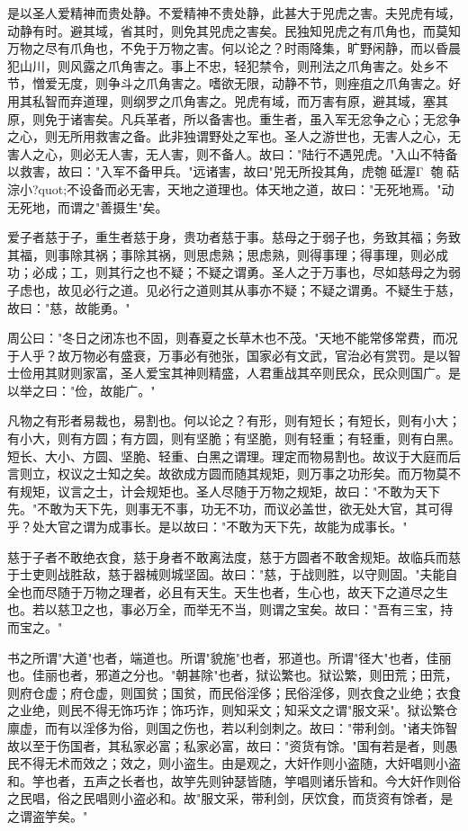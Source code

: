 \documentclass[]{article}
\begin{document}
是以圣人爱精神而贵处静。不爱精神不贵处静，此甚大于兕虎之害。夫兕虎有域，动静有时。避其域，省其时，则免其兕虎之害矣。民独知兕虎之有爪角也，而莫知万物之尽有爪角也，不免于万物之害。何以论之？时雨降集，旷野闲静，而以昏晨犯山川，则风露之爪角害之。事上不忠，轻犯禁令，则刑法之爪角害之。处乡不节，憎爱无度，则争斗之爪角害之。嗜欲无限，动静不节，则痤疽之爪角害之。好用其私智而弃道理，则纲罗之爪角害之。兕虎有域，而万害有原，避其域，塞其原，则免于诸害矣。凡兵革者，所以备害也。重生者，虽入军无忿争之心；无忿争之心，则无所用救害之备。此非独谓野处之军也。圣人之游世也，无害人之心，无害人之心，则必无人害，无人害，则不备人。故曰："陆行不遇兕虎。"入山不特备以救害，故曰："入军不备甲兵。"远诸害，故曰"兕无所投其角，虎匏砥渥Γ匏萜淙小?quot;不设备而必无害，天地之道理也。体天地之道，故曰："无死地焉。"动无死地，而谓之"善摄生"矣。

爱子者慈于子，重生者慈于身，贵功者慈于事。慈母之于弱子也，务致其福；务致其福，则事除其祸；事除其祸，则思虑熟；思虑熟，则得事理；得事理，则必成功；必成；工，则其行之也不疑；不疑之谓勇。圣人之于万事也，尽如慈母之为弱子虑也，故见必行之道。见必行之道则其从事亦不疑；不疑之谓勇。不疑生于慈，故曰："慈，故能勇。"

周公曰："冬日之闭冻也不固，则春夏之长草木也不茂。"天地不能常侈常费，而况于人乎？故万物必有盛衰，万事必有弛张，国家必有文武，官治必有赏罚。是以智士俭用其财则家富，圣人爱宝其神则精盛，人君重战其卒则民众，民众则国广。是以举之曰："俭，故能广。"

凡物之有形者易裁也，易割也。何以论之？有形，则有短长；有短长，则有小大；有小大，则有方圆；有方圆，则有坚脆；有坚脆，则有轻重；有轻重，则有白黑。短长、大小、方圆、坚脆、轻重、白黑之谓理。理定而物易割也。故议于大庭而后言则立，权议之士知之矣。故欲成方圆而随其规矩，则万事之功形矣。而万物莫不有规矩，议言之士，计会规矩也。圣人尽随于万物之规矩，故曰："不敢为天下先。"不敢为天下先，则事无不事，功无不功，而议必盖世，欲无处大官，其可得乎？处大官之谓为成事长。是以故曰："不敢为天下先，故能为成事长。"

慈于子者不敢绝衣食，慈于身者不敢离法度，慈于方圆者不敢舍规矩。故临兵而慈于士吏则战胜敌，慈于器械则城坚固。故曰："慈，于战则胜，以守则固。"夫能自全也而尽随于万物之理者，必且有天生。天生也者，生心也，故天下之道尽之生也。若以慈卫之也，事必万全，而举无不当，则谓之宝矣。故曰："吾有三宝，持而宝之。"

书之所谓"大道"也者，端道也。所谓"貌施"也者，邪道也。所谓"径大"也者，佳丽也。佳丽也者，邪道之分也。"朝甚除"也者，狱讼繁也。狱讼繁，则田荒；田荒，则府仓虚；府仓虚，则国贫；国贫，而民俗淫侈；民俗淫侈，则衣食之业绝；衣食之业绝，则民不得无饰巧诈；饰巧诈，则知采文；知采文之谓"服文采"。狱讼繁仓廪虚，而有以淫侈为俗，则国之伤也，若以利剑刺之。故曰："带利剑。"诸夫饰智故以至于伤国者，其私家必富；私家必富，故曰："资货有馀。"国有若是者，则愚民不得无术而效之；效之，则小盗生。由是观之，大奸作则小盗随，大奸唱则小盗和。竽也者，五声之长者也，故竽先则钟瑟皆随，竽唱则诸乐皆和。今大奸作则俗之民唱，俗之民唱则小盗必和。故"服文采，带利剑，厌饮食，而货资有馀者，是之谓盗竽矣。"
\end{document}
